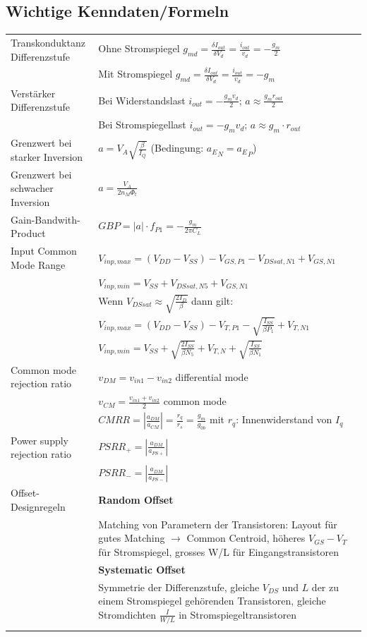 \subsection{Wichtige Kenndaten/Formeln}
\begin{tabular}{p{}p{}}
	Transkonduktanz Differenzstufe & Ohne Stromspiegel $g_{md}=\frac{\delta I_{out}}{\delta V_d}=\frac{i_{out}}{v_d}=-\frac{g_m}{2}$ \\
	& Mit Stromspiegel $g_{md}=\frac{\delta I_{out}}{\delta V_d}=\frac{i_{out}}{v_d}=-g_m$ \\
	Verstärker Differenzstufe&Bei Widerstandslast $i_{out}=-\frac{g_mv_d}{2}$; $a\approx \frac{g_mr_{out}}{2}$\\
	&Bei Stromspiegellast $i_{out}=-g_mv_d$; $a\approx g_m\cdot r_{out}$\\
	Grenzwert bei starker Inversion& $a=V_A \sqrt{\frac{\beta}{I_Q}}$ (Bedingung: ${a_E}_N = {a_E}_P$)\\
	Grenzwert bei schwacher Inversion& $a=\frac{V_A}{2n_M \Phi_t}$\\
	Gain-Bandwith-Product& $GBP=|a|\cdot f_{P1}=-\frac{g_m}{2\pi C_L}$\\
	Input Common Mode Range&$V_{inp,max}=(V_{DD}-V_{SS})-V_{GS,P1}-V_{DSsat,N1}+V_{GS,N1}$\\
	&$V_{inp,min}=V_{SS}+V_{DSsat,N5}+V_{GS,N1}$\\[2ex]
	&Wenn $V_{DSsat}\approx \sqrt{\frac{2I_D}{\beta}}$ dann gilt:\\
	&$V_{inp,max}=(V_{DD}-V_{SS})-V_{T,P1}-\sqrt{\frac{I_{SS}}{\beta P_1}}+V_{T,N1}$\\
	&$V_{inp,min}=V_{SS}+\sqrt{\frac{2I_{SS}}{\beta N_5}}+V_{T,N}+\sqrt{\frac{I_{SS}}{\beta N_1}}$\\
	Common mode rejection ratio&$v_{DM}=v_{in1}-v_{in2}$ differential mode\\
	&$v_{CM}=\frac{v_{in1}+v_{in2}}{2}$ common mode\\
	&$CMRR=|\frac{a_{DM}}{a_{CM}}|=\frac{r_q}{r_s}=\frac{g_m}{g_{0b}}$ mit $r_q$: Innenwiderstand von $I_q$\\
	Power supply rejection ratio& $PSRR_+=|\frac{a_{DM}}{a_{PS+}}|$\\
	&$PSRR_-=|\frac{a_{DM}}{a_{PS-}}|$\\
	Offset-Designregeln& \textbf{Random Offset}\\
	&Matching von Parametern der Transistoren: Layout für gutes Matching $\rightarrow$ Common Centroid, höheres $V_{GS}-V_T$ für Stromspiegel, grosses W/L für Eingangstransistoren\\
	&\textbf{Systematic Offset}\\
	&Symmetrie der Differenzstufe, gleiche $V_{DS}$ und $L$ der zu einem Stromspiegel gehörenden Transistoren, gleiche Stromdichten $\frac{I}{W/L}$ in Stromspiegeltransistoren\\
	& \textbf{}
\end{tabular}